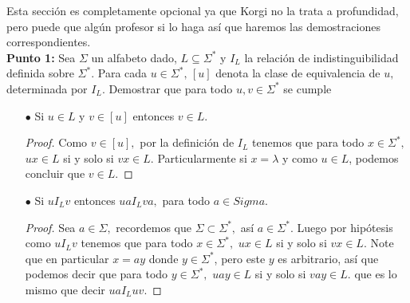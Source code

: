 
Esta sección es completamente opcional ya que Korgi no la trata a profundidad, pero puede que algún profesor si lo haga así que haremos las demostraciones correspondientes.\\

\textbf{Punto 1: }Sea $\Sigma$ un alfabeto dado, $L\subseteq\Sigma^*$ y $I_L$ la relación de indistinguibilidad definida sobre $\Sigma^*.$ Para cada $u\in\Sigma^*,\,[u]$ denota la clase de equivalencia de $u,$ determinada por $I_L.$ Demostrar que para todo $u,v\in\Sigma^*$ se cumple
\begin{itemize}
    \item[$\bullet$] Si $u\in L$ y $v\in[u]$ entonces $v\in L.$
    \begin{proof}
        Como $v\in[u],$ por la definición de $I_L$ tenemos que para todo $x\in\Sigma^*,$ $ux\in L$ si y solo si $vx\in L.$ Particularmente si $x=\lambda$ y como $u\in L$, podemos concluir que $v\in L.$ 
    \end{proof}
    \item[$\bullet$] Si $uI_Lv$ entonces $uaI_Lva,$ para todo $a\in Sigma.$
    \begin{proof}
        Sea $a\in\Sigma,$ recordemos que $\Sigma\subset\Sigma^*,$ así $a\in\Sigma^*.$ Luego por hipótesis como $uI_Lv$ tenemos que para todo $x\in\Sigma^*,$ $ux\in L$ si y solo si $vx\in L.$ Note que en particular $x=ay$ donde $y\in\Sigma^*$, pero este $y$ es arbitrario, así que podemos decir que para todo $y\in\Sigma^*,$ $uay\in L$ si y solo si $vay\in L.$ que es lo mismo que decir $uaI_Luv.$
    \end{proof}
\end{itemize}

